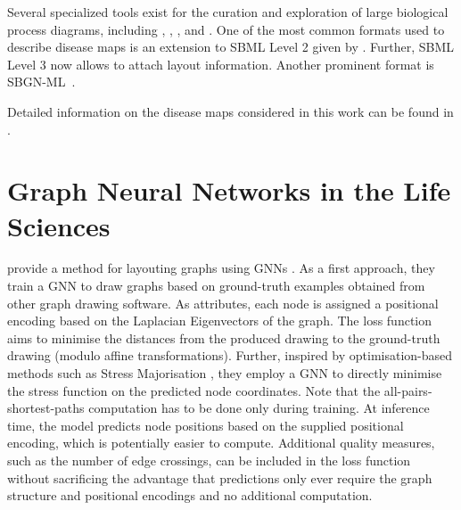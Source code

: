 \documentclass[
	fontsize=10pt, %
	twoside=true, %
	secnumdepth=1, %
  toc=indentunnumbered %
]{kaobook}
\begin{document}
Several specialized tools exist for the curation and exploration of large
biological process diagrams, including 
\cite{funahashi_CellDesignerVersatileModeling_2008}, 
\cite{gawron_MINERVAPlatformVisualization_2016}, 
\cite{kuperstein_NaviCellWebbasedEnvironment_2013}, 
\cite{shannon_cytoscape_2003} and 
\cite{rohn_VANTEDV2Framework_2012}.
%
One of the most common formats used to describe disease maps is an extension to SBML
Level 2 given by . Further, SBML Level 3 now allows to attach
layout information. Another prominent format is SBGN-ML~\cite{bergmann_SystemsBiologyGraphical_2020}.

Detailed information on the disease maps considered in this work can be found in
.



\section{Graph Neural Networks in the Life Sciences}
\label{sec:gnn-applications}





\citeauthor{tiezzi_GraphNeuralNetworks_2021} provide a method for layouting
graphs using GNNs
\cite{tiezzi_GraphNeuralNetworks_2021}
. As a first approach, they train a GNN to draw graphs based on
ground-truth examples obtained from other graph drawing software. As attributes,
each node is assigned a positional encoding based on the Laplacian Eigenvectors
of the graph. The loss function aims to minimise the distances from the produced
drawing to the ground-truth drawing (modulo affine transformations).
Further, inspired by optimisation-based methods such as Stress Majorisation
\cite{gansner_GraphDrawingStress_2005}, they employ a GNN to directly minimise
the stress function on the predicted node coordinates. Note that the
all-pairs-shortest-paths computation has to be done only during training. At
inference time, the model predicts node positions based on the supplied
positional encoding, which is potentially easier to compute. Additional quality
measures, such as the number of edge crossings, can be included in the loss
function without sacrificing the advantage that predictions only ever require
the graph structure and positional encodings and no additional computation.
\end{document}

